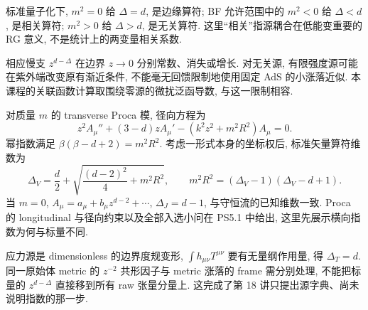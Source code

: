 标准量子化下, $m^2=0$ 给 $\Delta=d$, 是边缘算符; BF 允许范围中的 $m^2<0$ 给 $\Delta<d$, 是相关算符; $m^2>0$ 给 $\Delta>d$, 是无关算符. 这里“相关”指源耦合在低能变重要的 RG 意义, 不是统计上的两变量相关系数.

相应慢支 $z^{d-\Delta}$ 在边界 $z\to0$ 分别常数、消失或增长. 对无关源, 有限强度源可能在紫外端改变原有渐近条件, 不能毫无回馈限制地使用固定 AdS 的小涨落近似. 本课程的关联函数计算取围绕零源的微扰泛函导数, 与这一限制相容.

对质量 $m$ 的 transverse Proca 模, 径向方程为
\[
z^2A_\mu''+(3-d)zA_\mu'-(k^2z^2+m^2R^2)A_\mu=0.
\]
幂指数满足 $\beta(\beta-d+2)=m^2R^2$. 考虑一形式本身的坐标权后, 标准矢量算符维数为
\[
\Delta_V=\frac d2+\sqrt{\frac{(d-2)^2}4+m^2R^2},
\qquad m^2R^2=(\Delta_V-1)(\Delta_V-d+1).
\]
当 $m=0$, $A_\mu=a_\mu+b_\mu z^{d-2}+\cdots$, $\Delta_J=d-1$, 与守恒流的已知维数一致. Proca 的 longitudinal 与径向约束以及全部入选小问在 PS5.1 中给出, 这里先展示横向指数为何与标量不同.

应力源是 dimensionless 的边界度规变形, $\int h_{\mu\nu}T^{\mu\nu}$ 要有无量纲作用量, 得 $\Delta_T=d$. 同一原始体 metric 的 $z^{-2}$ 共形因子与 metric 涨落的 frame 需分别处理, 不能把标量的 $z^{d-\Delta}$ 直接移到所有 raw 张量分量上. 这完成了第 18 讲只提出源字典、尚未说明指数的那一步.
